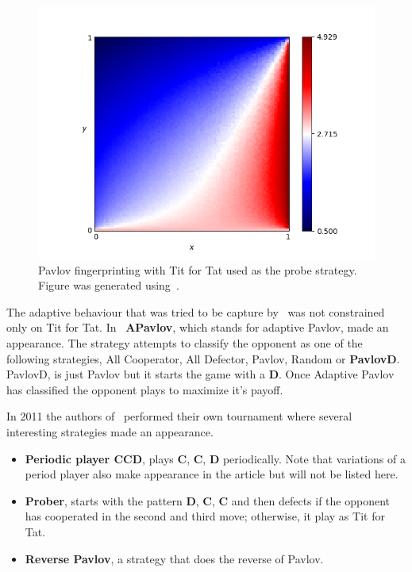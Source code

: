 \documentclass{article}
\theoremstyle{definition}
\begin{document}
\begin{figure}[!hbtp]
    \centering
    \includegraphics[height=.3\textheight]{./assets/images/Win-Stay_Lose-Shift.png}
    \caption{Pavlov fingerprinting with Tit for Tat used as the probe strategy.
    Figure was generated using~\cite{axelrodproject}.}
    \label{fig:fingerprinting}
\end{figure}

The adaptive behaviour that was tried to be capture by~\cite{tzafestas-2000a}
was not constrained only on Tit for Tat. In~\cite{Li2011} \textbf{APavlov},
which stands for adaptive Pavlov, made an appearance.  The strategy attempts to
classify the opponent as one of the following strategies, All Cooperator,
All Defector, Pavlov, Random or \textbf{PavlovD}. PavlovD, is just Pavlov
but it starts the game with a \textbf{D}. Once Adaptive Pavlov has classified
the opponent plays to maximize it's payoff.

In 2011 the authors of~\cite{Li2011} performed their own tournament where
several interesting strategies made an appearance.

\begin{itemize}
    \item \textbf{Periodic player CCD}, plays \textbf{C}, \textbf{C}, \textbf{D}
    periodically. Note that variations of a period player also make appearance
    in the article but will not be listed here.
    \item \textbf{Prober}, starts with the pattern \textbf{D}, \textbf{C}, \textbf{C}
     and then defects if the opponent has cooperated in the second and third move;
     otherwise, it play as Tit for Tat.
    \item \textbf{Reverse Pavlov}, a strategy that does the reverse of Pavlov.
\end{itemize}
\end{document}

